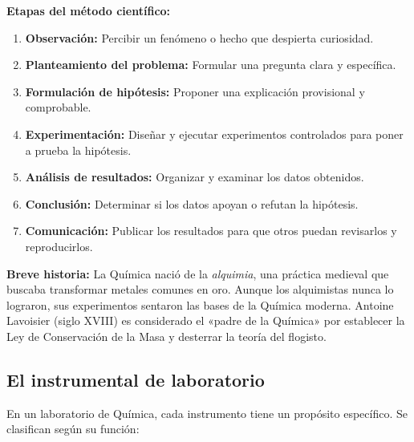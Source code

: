 \documentclass[12pt, a4paper]{article}
\begin{document}
\begin{cuadroteoria}
\textbf{Etapas del método científico:}
\begin{enumerate}[leftmargin=*, label=\arabic*.]
  \item \textbf{Observación:} Percibir un fenómeno o hecho que despierta curiosidad.
  \item \textbf{Planteamiento del problema:} Formular una pregunta clara y específica.
  \item \textbf{Formulación de hipótesis:} Proponer una explicación provisional y comprobable.
  \item \textbf{Experimentación:} Diseñar y ejecutar experimentos controlados para poner a prueba la hipótesis.
  \item \textbf{Análisis de resultados:} Organizar y examinar los datos obtenidos.
  \item \textbf{Conclusión:} Determinar si los datos apoyan o refutan la hipótesis.
  \item \textbf{Comunicación:} Publicar los resultados para que otros puedan revisarlos y reproducirlos.
\end{enumerate}
\end{cuadroteoria}

\begin{cuadroadvertencia}
\textbf{Breve historia:} La Química nació de la \emph{alquimia}, una práctica medieval que buscaba transformar metales comunes en oro. Aunque los alquimistas nunca lo lograron, sus experimentos sentaron las bases de la Química moderna. Antoine Lavoisier (siglo XVIII) es considerado el «padre de la Química» por establecer la Ley de Conservación de la Masa y desterrar la teoría del flogisto.
\end{cuadroadvertencia}

\subsection{El instrumental de laboratorio}

En un laboratorio de Química, cada instrumento tiene un propósito específico. Se clasifican según su función:
\end{document}
